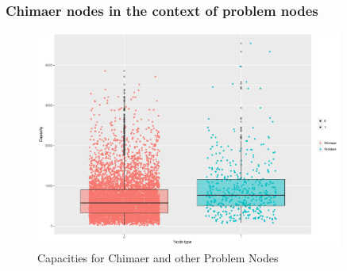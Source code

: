 \documentclass[10pt, compress]{beamer}
\begin{document}
\begin{frame}[fragile]
        \frametitle{Chimaer nodes in the context of problem nodes}
	\begin{figure}
        \includegraphics[width=0.9\textwidth]{categorial_flow_filtered.pdf}
	\caption{Capacities for Chimaer and other Problem Nodes}
	\end{figure}
\end{frame}


\end{document}
